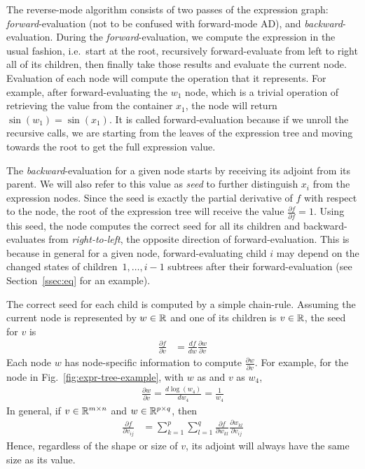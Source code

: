 The reverse-mode algorithm consists of two passes of the expression graph:
\emph{forward}-evaluation (not to be confused with forward-mode AD), 
and \emph{backward}-evaluation.
During the \emph{forward}-evaluation, we compute the expression in the usual fashion,
i.e.\ start at the root, recursively forward-evaluate from left to right all of its children,
then finally take those results and evaluate the current node.
Evaluation of each node will compute the operation that it represents.
For example, after forward-evaluating the $w_1$ node, 
which is a trivial operation of retrieving the value from the container $x_1$,
the  node will return~$\sin(w_1) = \sin(x_1)$.
It is called forward-evaluation because if we unroll the recursive calls,
we are starting from the leaves of the expression tree
and moving towards the root to get the full expression value.

The \emph{backward}-evaluation for a given node starts by receiving its adjoint from its parent.
We will also refer to this value as \emph{seed} to further distinguish $x_i$ from the expression nodes.
Since the seed is exactly the partial derivative of $f$ with respect to the node,
the root of the expression tree will receive the value $ \frac{\partial f}{\partial f} = 1$.
Using this seed, the node computes the correct seed for all its children and 
backward-evaluates from \emph{right-to-left}, the opposite direction of forward-evaluation.
This is because in general for a given node, forward-evaluating child $i$ may depend
on the changed states of children~$1,\ldots,i-1$ subtrees after their forward-evaluation
(see Section~\ref{ssec:eq} for an example).

The correct seed for each child is computed by a simple chain-rule.
Assuming the current node is represented by $w \in \mathbb{R}$ and one of its children is $v \in \mathbb{R}$,
the seed for $v$ is
\begin{align}
    \frac{\partial f}{\partial v} &=
    \frac{df}{dw} \frac{\partial w}{\partial v} \label{eq:next-seed}
\end{align}
Each node $w$ has node-specific information to compute $\frac{\partial w}{\partial v}$.
For example, for the  node in Fig.~\ref{fig:expr-tree-example},
with $w$ as  and $v$ as $w_4$,
\begin{align*}
    \frac{\partial w}{\partial v} = \frac{d\log(w_4)}{dw_4} = \frac{1}{w_4}
\end{align*}
In general, if $v \in \mathbb{R}^{m \times n}$ and $w \in \mathbb{R}^{p \times q}$, then
\begin{align*}
    \frac{\partial f}{\partial v_{ij}} &=
        \sum\limits_{k=1}^p \sum\limits_{l=1}^q 
        \frac{\partial f}{\partial w_{kl}} \frac{\partial w_{kl}}{\partial v_{ij}}
\end{align*}
Hence, regardless of the shape or size of $v$, 
its adjoint will always have the same size as its value.


